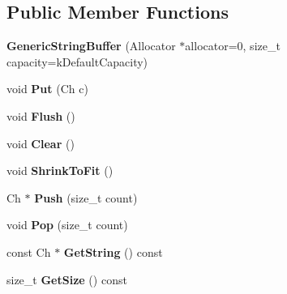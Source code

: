 \subsection*{Public Member Functions}
\begin{DoxyCompactItemize}
\item 
\mbox{\label{classGenericStringBuffer_a62f5ea1a53a2a3f98088f8c152b6183e}} 
{\bfseries Generic\+String\+Buffer} (Allocator $\ast$allocator=0, size\+\_\+t capacity=k\+Default\+Capacity)
\item 
\mbox{\label{classGenericStringBuffer_a8be5c8fadccacdcf40e20220f38e0afa}} 
void {\bfseries Put} (Ch c)
\item 
\mbox{\label{classGenericStringBuffer_a28bb539487db17b07314a532f3b8847c}} 
void {\bfseries Flush} ()
\item 
\mbox{\label{classGenericStringBuffer_a42f15c959046d899cb74c3120a6995f9}} 
void {\bfseries Clear} ()
\item 
\mbox{\label{classGenericStringBuffer_a0dbdb77489b95923795011a24f705be5}} 
void {\bfseries Shrink\+To\+Fit} ()
\item 
\mbox{\label{classGenericStringBuffer_a49fd10cdd5dd97a4cf9813d01334d660}} 
Ch $\ast$ {\bfseries Push} (size\+\_\+t count)
\item 
\mbox{\label{classGenericStringBuffer_a0038e53ba03c271bc4cbbac403ec4de4}} 
void {\bfseries Pop} (size\+\_\+t count)
\item 
\mbox{\label{classGenericStringBuffer_ab06b8c5f1385bd3dfd4caea8b7510f0b}} 
const Ch $\ast$ {\bfseries Get\+String} () const
\item 
\mbox{\label{classGenericStringBuffer_a725e862b9a78375f5363b0b61ad789f3}} 
size\+\_\+t {\bfseries Get\+Size} () const
\item 
\mbox{\label{classGenericStringBuffer_a62f5ea1a53a2a3f98088f8c152b6183e}} 

\end{DoxyCompactItemize}
